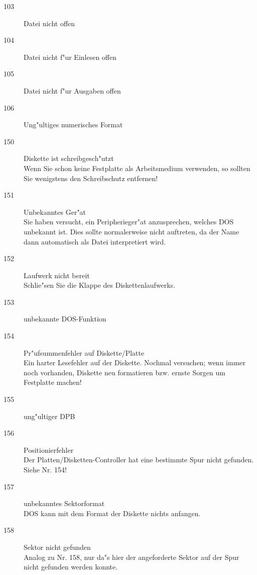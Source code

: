\documentclass[12pt,a4paper,twoside]{report}
\begin{document}
\begin{description}
\item[103]{Datei nicht offen}

\item[104]{Datei nicht f"ur Einlesen offen}

\item[105]{Datei nicht f"ur Ausgaben offen}

\item[106]{Ung"ultiges numerisches Format}

\item[150]{Diskette ist schreibgesch"utzt\\
           Wenn Sie schon keine Festplatte als Arbeitsmedium verwenden,
           so sollten Sie wenigstens den Schreibschutz entfernen!}

\item[151]{Unbekanntes Ger"at\\
           Sie haben versucht, ein Peripherieger"at anzusprechen, welches
           DOS unbekannt ist.  Dies sollte normalerweise nicht auftreten,
           da der Name dann automatisch als Datei interpretiert wird.}

\item[152]{Laufwerk nicht bereit\\
           Schlie"sen Sie die Klappe des Diskettenlaufwerks.}

\item[153]{unbekannte DOS-Funktion}

\item[154]{Pr"ufsummenfehler auf Diskette/Platte\\
           Ein harter Lesefehler auf der Diskette.  Nochmal versuchen; wenn
           immer noch vorhanden, Diskette neu formatieren bzw. ernste Sorgen
           um Festplatte machen!}

\item[155]{ung"ultiger DPB}

\item[156]{Positionierfehler\\
           Der Platten/Disketten-Controller hat eine bestimmte Spur nicht
           gefunden.  Siehe Nr. 154!}

\item[157]{unbekanntes Sektorformat\\
           DOS kann mit dem Format der Diskette nichts anfangen.}

\item[158]{Sektor nicht gefunden\\
           Analog zu Nr. 158, nur da"s hier der angeforderte Sektor auf
           der Spur nicht gefunden werden konnte.}


\end{description}
\end{document}
